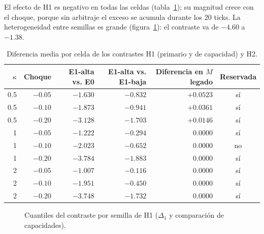 El efecto de H1 es negativo en todas las celdas (tabla~\ref{tab:celdas}); su magnitud crece con el choque, porque sin arbitraje el exceso se acumula durante los 20 ticks. La heterogeneidad entre semillas es grande (figura~\ref{fig:cuantiles}): el contraste va de $-4.60$ a $-1.38$.

\begin{table}[htbp]
\centering
\caption{Diferencia media por celda de los contrastes H1 (primario y de capacidad) y H2.}
\label{tab:celdas}
\small
\begin{tabular}{@{}rrrrrc@{}}
\toprule
$\kappa$ & Choque & E1-alta vs. E0 & E1-alta vs. E1-baja & Diferencia en $M$ legado & Reservada \\
\midrule
0.5 & $-0.05$ & $-1.630$ & $-0.832$ & $+0.0523$ & sí \\
0.5 & $-0.10$ & $-1.873$ & $-0.941$ & $+0.0361$ & sí \\
0.5 & $-0.20$ & $-3.128$ & $-1.703$ & $+0.0146$ & sí \\
1 & $-0.05$ & $-1.222$ & $-0.294$ & $0.0000$ & sí \\
1 & $-0.10$ & $-2.023$ & $-0.652$ & $0.0000$ & no \\
1 & $-0.20$ & $-3.784$ & $-1.883$ & $0.0000$ & sí \\
2 & $-0.05$ & $-1.007$ & $-0.116$ & $0.0000$ & sí \\
2 & $-0.10$ & $-1.951$ & $-0.450$ & $0.0000$ & sí \\
2 & $-0.20$ & $-3.748$ & $-1.732$ & $0.0000$ & sí \\
\bottomrule
\end{tabular}
\end{table}

\begin{figure}[htbp]
\centering
{}
\caption{Cuantiles del contraste por semilla de H1 ($\Delta_1$ y comparación de capacidades).}
\label{fig:cuantiles}
\end{figure}

